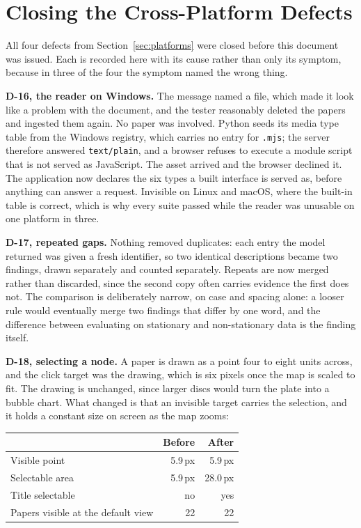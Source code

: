 \documentclass[12pt,a4paper]{report}
\begin{document}
\section{Closing the Cross-Platform Defects}\label{sec:closing}

All four defects from Section~\ref{sec:platforms} were closed before this document was issued.
Each is recorded here with its cause rather than only its symptom, because in
three of the four the symptom named the wrong thing.

\textbf{D-16, the reader on Windows.} The message named a file, which made it
look like a problem with the document, and the tester reasonably deleted the
papers and ingested them again. No paper was involved. Python seeds its media
type table from the Windows registry, which carries no entry for \texttt{.mjs};
the server therefore answered \texttt{text/plain}, and a browser refuses to
execute a module script that is not served as JavaScript. The asset arrived and
the browser declined it. The application now declares the six types a built
interface is served as, before anything can answer a request. Invisible on
Linux and macOS, where the built-in table is correct, which is why every suite
passed while the reader was unusable on one platform in three.

\textbf{D-17, repeated gaps.} Nothing removed duplicates: each entry the model
returned was given a fresh identifier, so two identical descriptions became two
findings, drawn separately and counted separately. Repeats are now merged
rather than discarded, since the second copy often carries evidence the first
does not. The comparison is deliberately narrow, on case and spacing alone: a
looser rule would eventually merge two findings that differ by one word, and
the difference between evaluating on stationary and non-stationary data is the
finding itself.

\textbf{D-18, selecting a node.} A paper is drawn as a point four to eight
units across, and the click target was the drawing, which is six pixels once
the map is scaled to fit. The drawing is unchanged, since larger discs would
turn the plate into a bubble chart. What changed is that an invisible target
carries the selection, and it holds a constant size on screen as the map zooms:

\begin{center}
\small
\begin{tabular}{@{}lrr@{}}
\toprule
& \textbf{Before} & \textbf{After} \\
\midrule
Visible point       & 5.9\,px  & 5.9\,px \\
Selectable area     & 5.9\,px  & 28.0\,px \\
Title selectable    & no       & yes \\
Papers visible at the default view & 22 & 22 \\
\bottomrule
\end{tabular}
\end{center}
\end{document}
